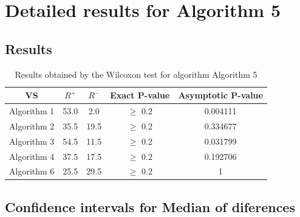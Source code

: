 \documentclass[a4paper,10pt]{article}
\begin{document}
 \clearpage 


\section{Detailed results for Algorithm 5}


\subsection{Results}

\begin{table}[!htp]
\centering\small
\begin{tabular}{
|c|c|c|c|c|}
\hline
 VS & $R^{+}$ & $R^{-}$ & Exact P-value & Asymptotic P-value \\ \hline 
Algorithm 1 & 53.0 & 2.0 & $\geq$ 0.2 & 0.004111\\ \hline 
Algorithm 2 & 35.5 & 19.5 & $\geq$ 0.2 & 0.334677\\ \hline 
Algorithm 3 & 54.5 & 11.5 & $\geq$ 0.2 & 0.031799\\ \hline 
Algorithm 4 & 37.5 & 17.5 & $\geq$ 0.2 & 0.192706\\ \hline 
Algorithm 6 & 25.5 & 29.5 & $\geq$ 0.2 & 1\\ \hline 

\end{tabular}
\caption{Results obtained by the Wilcoxon test for algorithm Algorithm 5}
\end{table}

\subsection{Confidence intervals for Median of diferences}
\end{document}
